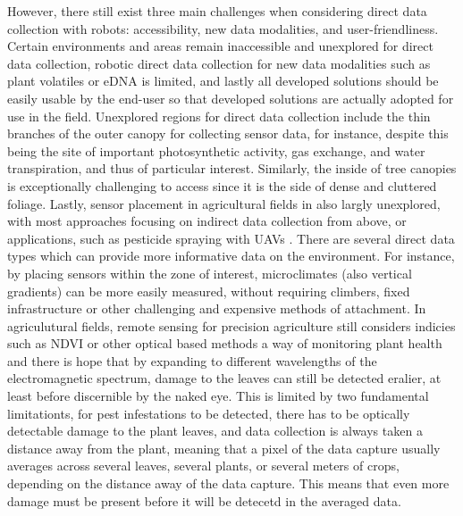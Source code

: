 However, there still exist three main challenges when considering direct data collection with robots: accessibility, new data modalities, and user-friendliness.
Certain environments and areas remain inaccessible and unexplored for direct data collection, robotic direct data collection for new data modalities such as plant volatiles or eDNA is limited, and lastly all developed solutions should be easily usable by the end-user so that developed solutions are actually adopted for use in the field.
Unexplored regions for direct data collection include the thin branches of the outer canopy for collecting sensor data, for instance, despite this being the site of important photosynthetic activity, gas exchange, and water transpiration, and thus of particular interest. 
Similarly, the inside of tree canopies is exceptionally challenging to access since it is the side of dense and cluttered foliage.  %
Lastly, sensor placement in agricultural fields in also largly unexplored, with most approaches focusing on indirect data collection from above, or applications, such as pesticide spraying with UAVs \cite{}.
There are several direct data types which can provide more informative data on the environment. For instance, by placing sensors within the zone of interest, microclimates (also vertical gradients) can be more easily measured, without requiring climbers, fixed infrastructure or other challenging and expensive methods of attachment. In agriculutural fields, remote sensing for precision agriculture still considers indicies such as NDVI or other optical based methods a way of monitoring plant health and there is hope that by expanding to different wavelengths of the electromagnetic spectrum, damage to the leaves can still be detected eralier, at least before discernible by the naked eye. This is limited by two fundamental limitationts, for pest infestations to be detected, there has to be optically detectable damage to the plant leaves, and data collection is always taken a distance away from the plant, meaning that a pixel of the data capture usually averages across several leaves, several plants, or several meters of crops, depending on the distance away of the data capture. This means that even more damage must be present before it will be detecetd in the averaged data. 
